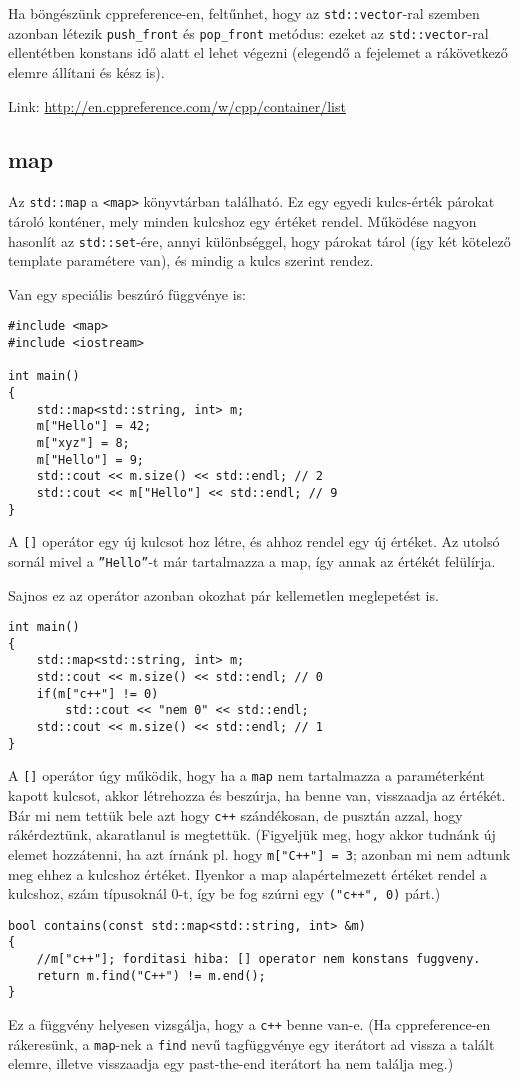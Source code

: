 \documentclass[a4paper,11.5pt]{article}
\begin{document}
	\medskip
	Ha böngészünk cppreference-en, feltűnhet, hogy az \texttt{std::vector}-ral szemben azonban létezik \texttt{push\_front} és \texttt{pop\_front} metódus: ezeket az \texttt{std::vector}-ral ellentétben konstans idő alatt el lehet végezni (elegendő a fejelemet a rákövetkező elemre állítani és kész is).
	\medskip
	
	Link: \url{http://en.cppreference.com/w/cpp/container/list}
	\subsection{map}
	Az \texttt{std::map} a \texttt{<map>} könyvtárban található. Ez egy egyedi kulcs-érték párokat tároló konténer, mely minden kulcshoz egy értéket rendel. Működése nagyon hasonlít az \texttt{std::set}-ére, annyi különbséggel, hogy párokat tárol (így két kötelező template paramétere van), és mindig a kulcs szerint rendez.
	\smallskip
	
	Van egy speciális beszúró függvénye is:
\begin{lstlisting}
#include <map>
#include <iostream>

int main()
{
	std::map<std::string, int> m;
	m["Hello"] = 42;
	m["xyz"] = 8;
	m["Hello"] = 9;
	std::cout << m.size() << std::endl; // 2
	std::cout << m["Hello"] << std::endl; // 9
}
\end{lstlisting}
	A \texttt{[]} operátor egy új kulcsot hoz létre, és ahhoz rendel egy új értéket. Az utolsó sornál mivel a \texttt{''Hello''}-t már tartalmazza a map, így annak az értékét felülírja.
	
	\medskip
	Sajnos ez az operátor azonban okozhat pár kellemetlen meglepetést is.
	\begin{lstlisting}
int main()
{
	std::map<std::string, int> m;
	std::cout << m.size() << std::endl; // 0
	if(m["c++"] != 0)
		std::cout << "nem 0" << std::endl;
	std::cout << m.size() << std::endl; // 1
}
	\end{lstlisting}
	A \texttt{[]} operátor úgy működik, hogy ha a \texttt{map} nem tartalmazza a paraméterként kapott kulcsot, akkor létrehozza és beszúrja, ha benne van, visszaadja az értékét. Bár mi nem tettük bele azt hogy \texttt{c++} szándékosan, de pusztán azzal, hogy rákérdeztünk, akaratlanul is megtettük. (Figyeljük meg, hogy akkor tudnánk új elemet hozzátenni, ha azt írnánk pl. hogy \texttt{m["C++"] = 3}; azonban mi nem adtunk meg ehhez a kulcshoz értéket. Ilyenkor a map alapértelmezett értéket rendel a kulcshoz, szám típusoknál 0-t, így be fog szúrni egy \texttt{("c++", 0)} párt.)
	\begin{lstlisting}
bool contains(const std::map<std::string, int> &m)
{
	//m["c++"]; forditasi hiba: [] operator nem konstans fuggveny.
	return m.find("C++") != m.end();
}
	\end{lstlisting}
	Ez a függvény helyesen vizsgálja, hogy a \texttt{c++} benne van-e. (Ha cppreference-en rákeresünk, a \texttt{map}-nek a \texttt{find} nevű tagfüggvénye egy iterátort ad vissza a talált elemre, illetve visszaadja egy past-the-end iterátort ha nem találja meg.)
	\medskip
	
\end{document}

